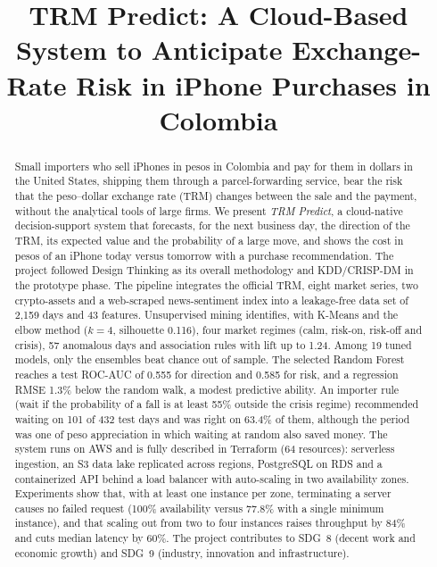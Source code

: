 \documentclass[conference]{IEEEtran}
\begin{document}
\title{TRM Predict: A Cloud-Based System to Anticipate Exchange-Rate Risk in iPhone Purchases in Colombia}

\author{
}

\maketitle

\begin{abstract}
Small importers who sell iPhones in pesos in Colombia and pay for them in dollars in the United States, shipping them through a parcel-forwarding service, bear the risk that the peso--dollar exchange rate (TRM) changes between the sale and the payment, without the analytical tools of large firms. We present \emph{TRM Predict}, a cloud-native decision-support system that forecasts, for the next business day, the direction of the TRM, its expected value and the probability of a large move, and shows the cost in pesos of an iPhone today versus tomorrow with a purchase recommendation. The project followed Design Thinking as its overall methodology and KDD/CRISP-DM in the prototype phase. The pipeline integrates the official TRM, eight market series, two crypto-assets and a web-scraped news-sentiment index into a leakage-free data set of 2{,}159 days and 43 features. Unsupervised mining identifies, with K-Means and the elbow method ($k=4$, silhouette 0.116), four market regimes (calm, risk-on, risk-off and crisis), 57 anomalous days and association rules with lift up to 1.24. Among 19 tuned models, only the ensembles beat chance out of sample. The selected Random Forest reaches a test ROC-AUC of 0.555 for direction and 0.585 for risk, and a regression RMSE 1.3\% below the random walk, a modest predictive ability. An importer rule (wait if the probability of a fall is at least 55\% outside the crisis regime) recommended waiting on 101 of 432 test days and was right on 63.4\% of them, although the period was one of peso appreciation in which waiting at random also saved money. The system runs on AWS and is fully described in Terraform (64 resources): serverless ingestion, an S3 data lake replicated across regions, PostgreSQL on RDS and a containerized API behind a load balancer with auto-scaling in two availability zones. Experiments show that, with at least one instance per zone, terminating a server causes no failed request (100\% availability versus 77.8\% with a single minimum instance), and that scaling out from two to four instances raises throughput by 84\% and cuts median latency by 60\%. The project contributes to SDG~8 (decent work and economic growth) and SDG~9 (industry, innovation and infrastructure).
\end{abstract}
\end{document}
